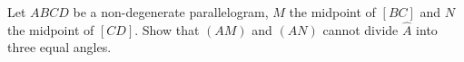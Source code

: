 Let $ABCD$ be a non-degenerate parallelogram, $M$ the midpoint of $[BC]$ and $N$ the midpoint of $[CD]$. Show that $(AM)$ and $(AN)$ cannot divide $\hat{A}$ into three equal angles.
